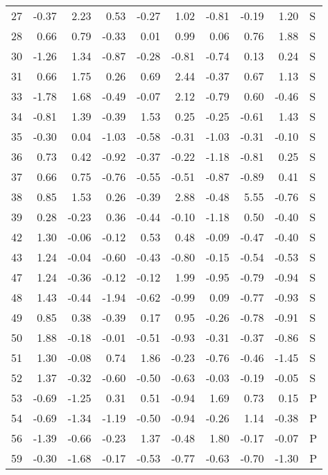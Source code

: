 \begin{table}[ht]
\begin{tabular}{rrrrrrrrrl}
  27 & -0.37 & 2.23 & 0.53 & -0.27 & 1.02 & -0.81 & -0.19 & 1.20 & S \\ 
  28 & 0.66 & 0.79 & -0.33 & 0.01 & 0.99 & 0.06 & 0.76 & 1.88 & S \\ 
  30 & -1.26 & 1.34 & -0.87 & -0.28 & -0.81 & -0.74 & 0.13 & 0.24 & S \\ 
  31 & 0.66 & 1.75 & 0.26 & 0.69 & 2.44 & -0.37 & 0.67 & 1.13 & S \\ 
  33 & -1.78 & 1.68 & -0.49 & -0.07 & 2.12 & -0.79 & 0.60 & -0.46 & S \\ 
  34 & -0.81 & 1.39 & -0.39 & 1.53 & 0.25 & -0.25 & -0.61 & 1.43 & S \\ 
  35 & -0.30 & 0.04 & -1.03 & -0.58 & -0.31 & -1.03 & -0.31 & -0.10 & S \\ 
  36 & 0.73 & 0.42 & -0.92 & -0.37 & -0.22 & -1.18 & -0.81 & 0.25 & S \\ 
  37 & 0.66 & 0.75 & -0.76 & -0.55 & -0.51 & -0.87 & -0.89 & 0.41 & S \\ 
  38 & 0.85 & 1.53 & 0.26 & -0.39 & 2.88 & -0.48 & 5.55 & -0.76 & S \\ 
  39 & 0.28 & -0.23 & 0.36 & -0.44 & -0.10 & -1.18 & 0.50 & -0.40 & S \\ 
  42 & 1.30 & -0.06 & -0.12 & 0.53 & 0.48 & -0.09 & -0.47 & -0.40 & S \\ 
  43 & 1.24 & -0.04 & -0.60 & -0.43 & -0.80 & -0.15 & -0.54 & -0.53 & S \\ 
  47 & 1.24 & -0.36 & -0.12 & -0.12 & 1.99 & -0.95 & -0.79 & -0.94 & S \\ 
  48 & 1.43 & -0.44 & -1.94 & -0.62 & -0.99 & 0.09 & -0.77 & -0.93 & S \\ 
  49 & 0.85 & 0.38 & -0.39 & 0.17 & 0.95 & -0.26 & -0.78 & -0.91 & S \\ 
  50 & 1.88 & -0.18 & -0.01 & -0.51 & -0.93 & -0.31 & -0.37 & -0.86 & S \\ 
  51 & 1.30 & -0.08 & 0.74 & 1.86 & -0.23 & -0.76 & -0.46 & -1.45 & S \\ 
  52 & 1.37 & -0.32 & -0.60 & -0.50 & -0.63 & -0.03 & -0.19 & -0.05 & S \\ 
  53 & -0.69 & -1.25 & 0.31 & 0.51 & -0.94 & 1.69 & 0.73 & 0.15 & P \\ 
  54 & -0.69 & -1.34 & -1.19 & -0.50 & -0.94 & -0.26 & 1.14 & -0.38 & P \\ 
  56 & -1.39 & -0.66 & -0.23 & 1.37 & -0.48 & 1.80 & -0.17 & -0.07 & P \\ 
  59 & -0.30 & -1.68 & -0.17 & -0.53 & -0.77 & -0.63 & -0.70 & -1.30 & P \\ 

\end{tabular}
\end{table}
